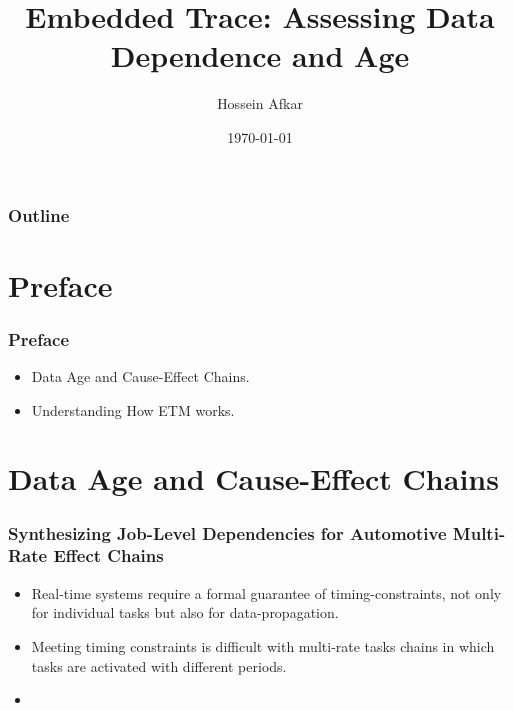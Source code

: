\documentclass{beamer}
\title[Embedded Trace]
{Embedded Trace: Assessing Data Dependence and Age}
\author[]{Hossein Afkar}
\institute{DRTS Lab}
\date{\today}
\begin{document}
\frame{\titlepage}

\begin{frame}
    \frametitle{Outline}
    \tableofcontents[hideallsubsections]
\end{frame}


\section{Preface}
\begin{frame}
    \frametitle{Preface}
    \begin{itemize}
        \item Data Age and Cause-Effect Chains.
        \item Understanding How ETM works.
    \end{itemize}
\end{frame}

\section{Data Age and Cause-Effect Chains}
\begin{frame}
    \frametitle{Synthesizing Job-Level Dependencies for Automotive
    Multi-Rate Effect Chains}
    \begin{itemize}
        \item Real-time systems require a formal guarantee of
            timing-constraints, not only for individual tasks but also
            for data-propagation.
        \item Meeting timing constraints is difficult with multi-rate tasks
            chains in which tasks are activated with different periods.
        \item 
    \end{itemize}
\end{frame}
\end{document}
